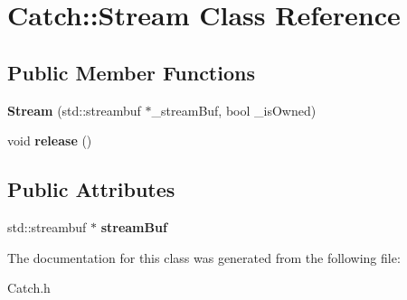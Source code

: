 \hypertarget{class_catch_1_1_stream}{\section{Catch\-:\-:Stream Class Reference}
\label{class_catch_1_1_stream}
}
\subsection*{Public Member Functions}
\begin{DoxyCompactItemize}
\item 
\hypertarget{class_catch_1_1_stream_a4d2f8a31699cda5e552372e37f78f5dc}{{\bfseries Stream} (std\-::streambuf $\ast$\-\_\-stream\-Buf, bool \-\_\-is\-Owned)}\label{class_catch_1_1_stream_a4d2f8a31699cda5e552372e37f78f5dc}

\item 
\hypertarget{class_catch_1_1_stream_aff188f0e04418234a6a9120a65d058f6}{void {\bfseries release} ()}\label{class_catch_1_1_stream_aff188f0e04418234a6a9120a65d058f6}

\end{DoxyCompactItemize}
\subsection*{Public Attributes}
\begin{DoxyCompactItemize}
\item 
\hypertarget{class_catch_1_1_stream_abd878112035b66f6682e4ba20ee03d72}{std\-::streambuf $\ast$ {\bfseries stream\-Buf}}\label{class_catch_1_1_stream_abd878112035b66f6682e4ba20ee03d72}

\end{DoxyCompactItemize}


The documentation for this class was generated from the following file\-:\begin{DoxyCompactItemize}
\item 
Catch.\-h\end{DoxyCompactItemize}
